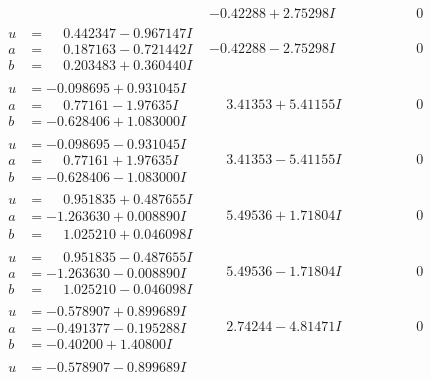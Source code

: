 \documentclass[1p]{elsarticle_modified}
\theoremstyle{definition}
\begin{document}
$$\begin{array}{c|c|c}
 & -0.42288 + 2.75298 I & \phantom{-0.000000 } 0 \\ \hline\begin{aligned}
u &= \phantom{-}0.442347 - 0.967147 I \\
a &= \phantom{-}0.187163 - 0.721442 I \\
b &= \phantom{-}0.203483 + 0.360440 I\end{aligned}
 & -0.42288 - 2.75298 I & \phantom{-0.000000 } 0 \\ \hline\begin{aligned}
u &= -0.098695 + 0.931045 I \\
a &= \phantom{-}0.77161 - 1.97635 I \\
b &= -0.628406 + 1.083000 I\end{aligned}
 & \phantom{-}3.41353 + 5.41155 I & \phantom{-0.000000 } 0 \\ \hline\begin{aligned}
u &= -0.098695 - 0.931045 I \\
a &= \phantom{-}0.77161 + 1.97635 I \\
b &= -0.628406 - 1.083000 I\end{aligned}
 & \phantom{-}3.41353 - 5.41155 I & \phantom{-0.000000 } 0 \\ \hline\begin{aligned}
u &= \phantom{-}0.951835 + 0.487655 I \\
a &= -1.263630 + 0.008890 I \\
b &= \phantom{-}1.025210 + 0.046098 I\end{aligned}
 & \phantom{-}5.49536 + 1.71804 I & \phantom{-0.000000 } 0 \\ \hline\begin{aligned}
u &= \phantom{-}0.951835 - 0.487655 I \\
a &= -1.263630 - 0.008890 I \\
b &= \phantom{-}1.025210 - 0.046098 I\end{aligned}
 & \phantom{-}5.49536 - 1.71804 I & \phantom{-0.000000 } 0 \\ \hline\begin{aligned}
u &= -0.578907 + 0.899689 I \\
a &= -0.491377 - 0.195288 I \\
b &= -0.40200 + 1.40800 I\end{aligned}
 & \phantom{-}2.74244 - 4.81471 I & \phantom{-0.000000 } 0 \\ \hline\begin{aligned}
u &= -0.578907 - 0.899689 I \\

\end{aligned}
\end{array}$$
\end{document}
